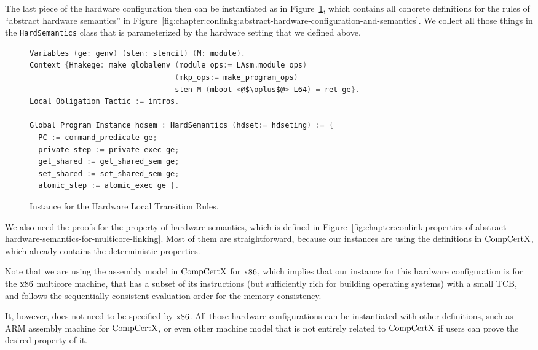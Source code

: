The last piece of the hardware configuration then can be instantiated as in Figure~\ref{fig:chapter:certikos:hardware-local-step-transition-rules},
which contains all concrete definitions for the rules of ``abstract hardware semantics'' in  Figure~\ref{fig:chapter:conlinkg:abstract-hardware-configuration-and-semantics}.
We collect all those things in the \lstinline$HardSemantics$ class that is parameterized by the hardware setting that we defined above. 
\begin{figure}
\begin{lstlisting}[language=C]
Variables (ge: genv) (sten: stencil) (M: module).
Context {Hmakege: make_globalenv (module_ops:= LAsm.module_ops) 
                                 (mkp_ops:= make_program_ops) 
                                 sten M (mboot <@$\oplus$@> L64) = ret ge}.
Local Obligation Tactic := intros.

Global Program Instance hdsem : HardSemantics (hdset:= hdseting) := {
  PC := command_predicate ge;
  private_step := private_exec ge;
  get_shared := get_shared_sem ge;
  set_shared := set_shared_sem ge;
  atomic_step := atomic_exec ge }.
\end{lstlisting}
\caption{Instance for the Hardware Local Transition Rules.}
\label{fig:chapter:certikos:hardware-local-step-transition-rules}
\end{figure}
We also need the proofs for the property of hardware semantics, which is defined in Figure~\ref{fig:chapter:conlink:properties-of-abstract-hardware-semantics-for-multicore-linking}. 
Most of them are straightforward, because our instances are using the definitions in $\mathrm{CompCertX}$,
which already contains the deterministic properties. 

Note that we are using the assembly model in $\mathrm{CompCertX}$ for $\mathrm{x86}$, which implies that 
our instance for this hardware configuration is 
for the $\mathrm{x86}$ multicore machine,
that has a subset of its instructions (but sufficiently rich for building operating systems) with a small TCB, 
and follows the sequentially consistent evaluation order for the memory consistency. 

It, however, does not need to be specified by $\mathrm{x86}$. 
All  those hardware configurations can be instantiated with other definitions, such as ARM assembly machine for $\mathrm{CompCertX}$, 
or even other machine model that is not entirely related to $\mathrm{CompCertX}$ if users can prove the desired property of it. 
